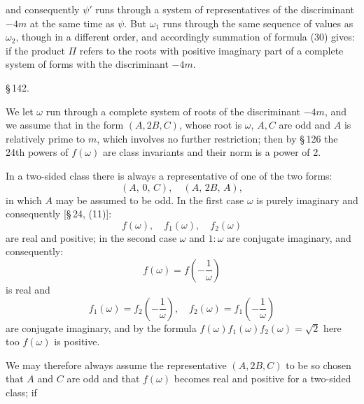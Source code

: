 
and consequently $\psi'$ runs through a system of representatives of the discriminant $-4m$ at the same time as $\psi$. But $\omega_1$ runs through the same sequence of values as $\omega_2$, though in a different order, and accordingly summation of formula (30) gives:
if the product $\Pi$ refers to the roots with positive imaginary part of a complete system of forms with the discriminant $-4m$.

\begin{quote}
\end{quote}

\S\,142. 

We let $\omega$ run through a complete system of roots of the discriminant $-4m$, and we assume that in the form $(A, 2B, C)$, whose root is $\omega$, $A, C$ are odd and $A$ is relatively prime to $m$, which involves no further restriction; then by \S\,126 the 24th powers of $f(\omega)$ are class invariants and their norm is a power of 2.

In a two-sided class there is always a representative of one of the two forms:
\[
(A,\,0,\,C),\quad (A,\,2B,\,A),
\]
in which $A$ may be assumed to be odd. In the first case $\omega$ is purely imaginary and consequently [\S\,24, (11)]:
\[
f(\omega),\quad f_1(\omega),\quad f_2(\omega)
\]
are real and positive; in the second case $\omega$ and $1:\omega$ are conjugate imaginary, and consequently:
\[
f(\omega) = f\!\left(-\frac{1}{\omega}\right)
\]
is real and
\[
f_1(\omega) = f_2\!\left(-\frac{1}{\omega}\right),\quad f_2(\omega) = f_1\!\left(-\frac{1}{\omega}\right)
\]
are conjugate imaginary, and by the formula $f(\omega)f_1(\omega)f_2(\omega)=\sqrt 2$ here too $f(\omega)$ is positive.

We may therefore always assume the representative $(A, 2B, C)$ to be so chosen that $A$ and $C$ are odd and that $f(\omega)$ becomes real and positive for a two-sided class; if
